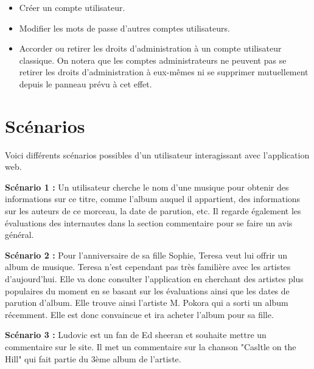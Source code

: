 \begin{paragraphe}
            \vspace{1em}
            \begin{itemize}
                \item Créer un compte utilisateur.
                \item Modifier les mots de passe d'autres comptes utilisateurs.
                \item Accorder ou retirer les droits d'administration à un compte utilisateur classique.
                On notera que les comptes administrateurs ne peuvent pas se retirer les droits 
                d'administration à eux-mêmes ni se supprimer mutuellement depuis le panneau prévu à cet effet.
            \end{itemize}
        \end{paragraphe}

\section{Scénarios}

    \begin{paragraphe}
        Voici différents scénarios possibles d'un utilisateur interagissant avec
        l'application web.
    \end{paragraphe}

    \begin{paragraphe}
        \textbf{Scénario 1 :}
        Un utilisateur cherche le nom d'une musique pour obtenir des informations
        sur ce titre, comme l'album auquel il appartient, des informations sur les
        auteurs de ce morceau, la date de parution, etc. Il regarde également les évaluations
        des internautes dans la section commentaire pour se faire un avis général.
    \end{paragraphe}

    \begin{paragraphe}
        \textbf{Scénario 2 :}
        Pour l'anniversaire de sa fille Sophie, Teresa veut lui offrir un album de
        musique. Teresa n'est cependant pas très familière avec les artistes
        d'aujourd'hui. Elle va donc consulter l'application en cherchant des
        artistes plus populaires du moment en se basant sur les évaluations ainsi que les dates de parution d'album. 
        Elle trouve ainsi l'artiste M. Pokora qui a sorti un album récemment. Elle est donc convaincue et ira
        acheter l'album pour sa fille.
    \end{paragraphe}

    \begin{paragraphe}
        \textbf{Scénario 3 :}
        Ludovic est un fan de Ed sheeran et souhaite mettre un commentaire sur le
        site.
        Il met un commentaire sur la chanson "Casltle on the Hill" qui fait partie
        du 3ème album de l'artiste.
    \end{paragraphe}

